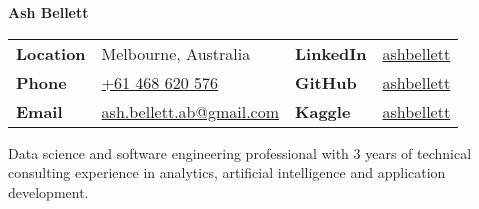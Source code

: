 \documentclass[a4paper,10pt]{letter}
\begin{document}
\LARGE
\textbf{Ash Bellett}\\
\large
\newline
\begin{tabular}{ @{} p{2cm} p{8cm} p{2cm} l }
\textbf{Location} & Melbourne, Australia & \textbf{LinkedIn} & \href{https://www.linkedin.com/in/ashbellett}{ashbellett} \\ 
\textbf{Phone} & \href{tel:61468620576}{+61 468 620 576} & \textbf{GitHub} & \href{https://www.github.com/ashbellett}{ashbellett} \\
\textbf{Email} & \href{mailto:ash.bellett.ab@gmail.com}{ash.bellett.ab@gmail.com} & \textbf{Kaggle} & \href{https://www.kaggle.com/ashbellett}{ashbellett} 
\end{tabular}

Data science and software engineering professional with 3 years of technical consulting experience in analytics, artificial intelligence and application development.
\end{document}
